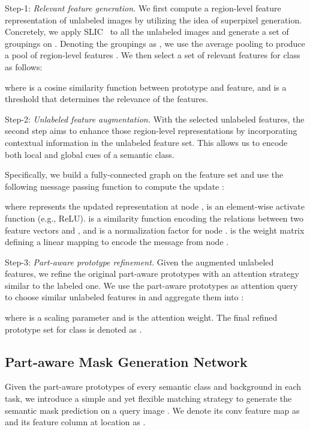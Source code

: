\documentclass[runningheads]{llncs}
\begin{document}
Step-1: \textit{Relevant feature generation.} 
We first compute a region-level feature representation of unlabeled images by utilizing the idea of superpixel generation. Concretely, we apply SLIC~\cite{alkslic} to all the unlabeled images and generate a set of groupings on . Denoting the groupings as , we use the average pooling to produce a pool of region-level features . We then select a set of relevant features for class  as follows:

where  is a {cosine similarity} function between prototype and feature, and  is a threshold that determines the relevance of the features.  

Step-2: \textit{Unlabeled feature augmentation.}
With the selected unlabeled features, the second step aims to enhance those region-level representations by incorporating contextual information in the unlabeled feature set. This allows us to encode both local and global cues of a semantic class.  

Specifically, we build a fully-connected graph on the feature set  and use the following message passing function to compute the update : 

where  represents the updated representation at node ,  is an element-wise activate function (e.g., ReLU).  is a similarity function encoding the relations between two feature vectors  and , and  is a normalization factor for node .  is the weight matrix defining a linear mapping to encode the message from node . 

Step-3: \textit{Part-aware prototype refinement.}
Given the augmented unlabeled features, we refine the original part-aware prototypes with an attention strategy similar to the labeled one.
We use the part-aware prototypes  as attention query to choose  similar unlabeled features in  and aggregate them into : 

where  is a scaling parameter and  is the attention weight. The final refined prototype set for class  is denoted as .



\subsection{Part-aware Mask Generation Network}\label{sec:part-aware}
Given the part-aware prototypes  of every semantic class and background in each task, we introduce a simple and yet flexible matching strategy to generate the semantic mask prediction on a query image . We denote its conv feature map as  and its feature column at location  as .
\end{document}
